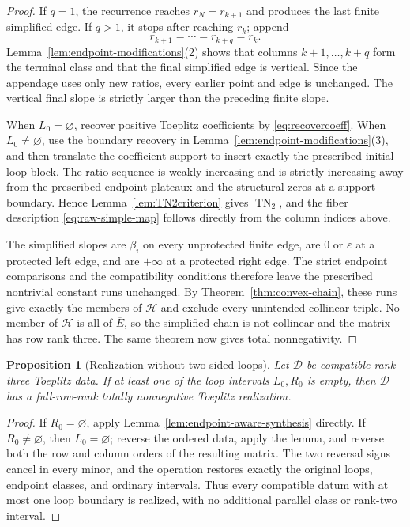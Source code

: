 \documentclass{amsart}
\numberwithin{equation}{section}
\newtheorem{proposition}[theorem]{Proposition}
\theoremstyle{definition}
\theoremstyle{remark}
\DeclareMathOperator{\TN}{TN}
\begin{document}
\begin{proof}
If $q=1$, the recurrence reaches $r_N=r_{k+1}$ and produces the last finite simplified edge.  If $q>1$, it stops after reaching $r_k$; append
\[
 r_{k+1}=\cdots=r_{k+q}=r_k.
\]
Lemma~\ref{lem:endpoint-modifications}(2) shows that columns $k+1,\ldots,k+q$ form the terminal class and that the final simplified edge is vertical.  Since the appendage uses only new ratios, every earlier point and edge is unchanged.  The vertical final slope is strictly larger than the preceding finite slope.

When $L_0=\varnothing$, recover positive Toeplitz coefficients by \eqref{eq:recovercoeff}.  When $L_0\ne\varnothing$, use the boundary recovery in Lemma~\ref{lem:endpoint-modifications}(3), and then translate the coefficient support to insert exactly the prescribed initial loop block.  The ratio sequence is weakly increasing and is strictly increasing away from the prescribed endpoint plateaux and the structural zeros at a support boundary.  Hence Lemma~\ref{lem:TN2criterion} gives $\TN_2$, and the fiber description \eqref{eq:raw-simple-map} follows directly from the column indices above.

The simplified slopes are $\beta_i$ on every unprotected finite edge, are $0$ or $\varepsilon$ at a protected left edge, and are $+\infty$ at a protected right edge.  The strict endpoint comparisons and the compatibility conditions therefore leave the prescribed nontrivial constant runs unchanged.  By Theorem~\ref{thm:convex-chain}, these runs give exactly the members of $\mathcal H$ and exclude every unintended collinear triple.  No member of $\mathcal H$ is all of $\overline E$, so the simplified chain is not collinear and the matrix has row rank three.  The same theorem now gives total nonnegativity.
\end{proof}

\begin{proposition}[Realization without two-sided loops]\label{prop:one-sided-realization}
Let $\mathcal D$ be compatible rank-three Toeplitz data.  If at least one of the loop intervals $L_0,R_0$ is empty, then $\mathcal D$ has a full-row-rank totally nonnegative Toeplitz realization.
\end{proposition}

\begin{proof}
If $R_0=\varnothing$, apply Lemma~\ref{lem:endpoint-aware-synthesis} directly.  If $R_0\ne\varnothing$, then $L_0=\varnothing$; reverse the ordered data, apply the lemma, and reverse both the row and column orders of the resulting matrix.  The two reversal signs cancel in every minor, and the operation restores exactly the original loops, endpoint classes, and ordinary intervals.  Thus every compatible datum with at most one loop boundary is realized, with no additional parallel class or rank-two interval.
\end{proof}
\end{document}
